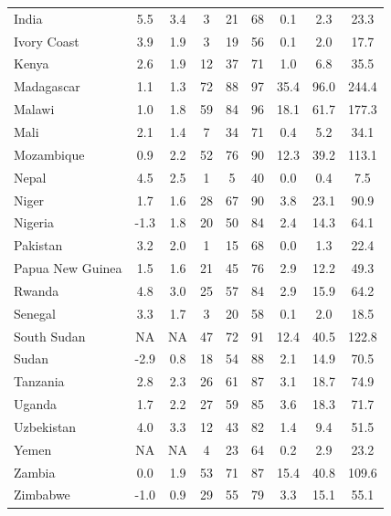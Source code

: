 \documentclass[12pt,english]{article}
\begin{document}
\begin{table}[b]
{\begin{tabular}[t]{lcccccccc}
    India & 5.5 & 3.4 & 3 & 21 & 68 & 0.1 & 2.3 & 23.3\\
    Ivory Coast & 3.9 & 1.9 & 3 & 19 & 56 & 0.1 & 2.0 & 17.7\\
    Kenya & 2.6 & 1.9 & 12 & 37 & 71 & 1.0 & 6.8 & 35.5\\
    Madagascar & 1.1 & 1.3 & 72 & 88 & 97 & 35.4 & 96.0 & 244.4\\
    Malawi & 1.0 & 1.8 & 59 & 84 & 96 & 18.1 & 61.7 & 177.3\\
    Mali & 2.1 & 1.4 & 7 & 34 & 71 & 0.4 & 5.2 & 34.1\\
    Mozambique & 0.9 & 2.2 & 52 & 76 & 90 & 12.3 & 39.2 & 113.1\\
    Nepal & 4.5 & 2.5 & 1 & 5 & 40 & 0.0 & 0.4 & 7.5\\
    Niger & 1.7 & 1.6 & 28 & 67 & 90 & 3.8 & 23.1 & 90.9\\
    Nigeria & -1.3 & 1.8 & 20 & 50 & 84 & 2.4 & 14.3 & 64.1\\
    Pakistan & 3.2 & 2.0 & 1 & 15 & 68 & 0.0 & 1.3 & 22.4\\
    Papua New Guinea & 1.5 & 1.6 & 21 & 45 & 76 & 2.9 & 12.2 & 49.3\\
    Rwanda & 4.8 & 3.0 & 25 & 57 & 84 & 2.9 & 15.9 & 64.2\\
    Senegal & 3.3 & 1.7 & 3 & 20 & 58 & 0.1 & 2.0 & 18.5\\
    South Sudan & NA & NA & 47 & 72 & 91 & 12.4 & 40.5 & 122.8\\
    Sudan & -2.9 & 0.8 & 18 & 54 & 88 & 2.1 & 14.9 & 70.5\\
    Tanzania & 2.8 & 2.3 & 26 & 61 & 87 & 3.1 & 18.7 & 74.9\\
    Uganda & 1.7 & 2.2 & 27 & 59 & 85 & 3.6 & 18.3 & 71.7\\
    Uzbekistan & 4.0 & 3.3 & 12 & 43 & 82 & 1.4 & 9.4 & 51.5\\
    Yemen & NA & NA & 4 & 23 & 64 & 0.2 & 2.9 & 23.2\\
    Zambia & 0.0 & 1.9 & 53 & 71 & 87 & 15.4 & 40.8 & 109.6\\
    Zimbabwe & -1.0 & 0.9 & 29 & 55 & 79 & 3.3 & 15.1 & 55.1\\
    \bottomrule
    \end{tabular}}
    \end{table}
\end{document}
